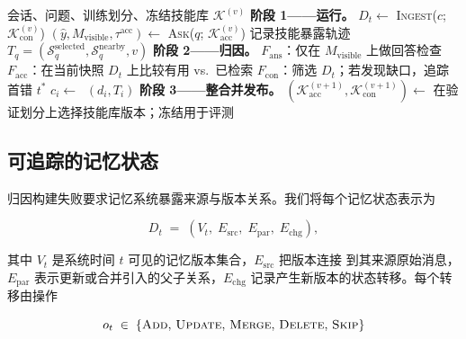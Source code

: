 \documentclass[UTF8,11pt]{ctexart}
\newcommand{\KK}{\mathcal{K}}
\DeclareMathOperator{\Cand}{G_{cand}}
\begin{document}
\begin{algorithm}[t]
\caption{失败驱动的技能学习（训练阶段）}
\label{alg:train}
\begin{algorithmic}[1]
\Require 会话、问题、训练划分、冻结技能库 $\KK^{(v)}$
\State \textbf{阶段 1——运行。}
  \State $D_t \leftarrow$ \textsc{Ingest}($c$;\; $\KK_{\mathrm{con}}^{(v)}$) 
    \State $(\hat{y}, M_{\mathrm{visible}}, \tau^{\mathrm{acc}}) \leftarrow$ \textsc{Ask}($q$;\; $\KK_{\mathrm{acc}}^{(v)}$)
    \State 记录技能暴露轨迹 $T_q = (\mathcal{S}^{\mathrm{selected}}_q, \mathcal{S}^{\mathrm{nearby}}_q, v)$
  \EndFor
\EndFor
\State \textbf{阶段 2——归因。}
  \State $F_{\mathrm{ans}}$：仅在 $M_{\mathrm{visible}}$ 上做回答检查
  \State $F_{\mathrm{acc}}$：在当前快照 $D_t$ 上比较有用 vs.\ 已检索
  \State $F_{\mathrm{con}}$：筛选 $D_t$；若发现缺口，追踪首错 $t^{*}$
    \State $c_i \leftarrow \Cand(d_i, T_i)$ 
  \EndFor
\EndFor
\State \textbf{阶段 3——整合并发布。}
\State $(\KK_{\mathrm{acc}}^{(v+1)}, \KK_{\mathrm{con}}^{(v+1)}) \leftarrow$ \Call{Consolidate}{候选, $\KK^{(v)}$} 
\State 在验证划分上选择技能库版本；冻结用于评测
\end{algorithmic}
\end{algorithm}

\subsection{可追踪的记忆状态}
\label{sec:method-states}

归因构建失败要求记忆系统暴露来源与版本关系。我们将每个记忆状态表示为

\begin{equation}
\label{eq:state}
D_t \;=\; \left(V_t,\; E_{\mathrm{src}},\; E_{\mathrm{par}},\; E_{\mathrm{chg}}\right),
\end{equation}

\noindent 其中 $V_t$ 是系统时间 $t$ 可见的记忆版本集合，$E_{\mathrm{src}}$ 把版本连接
到其来源原始消息，$E_{\mathrm{par}}$ 表示更新或合并引入的父子关系，$E_{\mathrm{chg}}$
记录产生新版本的状态转移。每个转移由操作

\begin{equation}
\label{eq:ops}
o_t \;\in\; \{\textsc{Add},\,\textsc{Update},\,\textsc{Merge},\,\textsc{Delete},\,\textsc{Skip}\}
\end{equation}
\end{document}
